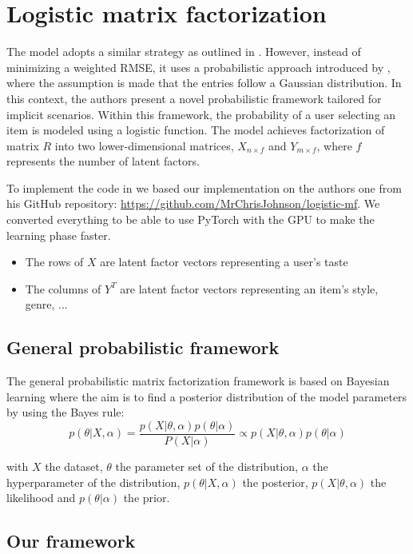 \chapter{Logistic matrix factorization} \label{chap:lmf}

The model adopts a similar strategy as outlined in \cite{4781121}. However, instead of minimizing a weighted RMSE, it uses a probabilistic approach introduced by \cite{NIPS2007_d7322ed7}, where the assumption is made that the entries follow a Gaussian distribution. In this context, the authors present a novel probabilistic framework tailored for implicit scenarios. Within this framework, the probability of a user selecting an item is modeled using a logistic function. The model achieves factorization of matrix $R$ into two lower-dimensional matrices, $X_{n \times f}$ and $Y_{m \times f}$, where $f$ represents the number of latent factors.

To implement the code in we based our implementation on the authors one from his GitHub repository: \url{https://github.com/MrChrisJohnson/logistic-mf}. We converted everything to be able to use PyTorch with the GPU to make the learning phase faster.

\begin{itemize}
    \item The rows of $X$ are latent factor vectors representing a user's taste
    \item The columns of $Y^T$ are latent factor vectors representing an item's style, genre, ...
\end{itemize}

\section{General probabilistic framework}

The general probabilistic matrix factorization framework is based on Bayesian learning where the aim is to find a posterior distribution of the model parameters by using the Bayes rule:
\[
p(\theta | X , \alpha) = \frac{p( X  | \theta, \alpha) p(\theta | \alpha)}{P( X | \alpha)} \propto p( X  | \theta, \alpha) p(\theta | \alpha)
\]

with $X$ the dataset, $\theta$ the parameter set of the distribution, $\alpha$ the hyperparameter of the distribution, $p(\theta | X , \alpha)$ the posterior, $p( X  | \theta, \alpha)$ the likelihood and $p(\theta | \alpha)$ the prior.

\section{Our framework}

